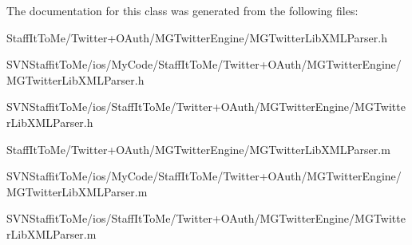 \-The documentation for this class was generated from the following files\-:\begin{DoxyCompactItemize}
\item 
\-Staff\-It\-To\-Me/\-Twitter+\-O\-Auth/\-M\-G\-Twitter\-Engine/\-M\-G\-Twitter\-Lib\-X\-M\-L\-Parser.\-h\item 
\-S\-V\-N\-Staffit\-To\-Me/ios/\-My\-Code/\-Staff\-It\-To\-Me/\-Twitter+\-O\-Auth/\-M\-G\-Twitter\-Engine/\-M\-G\-Twitter\-Lib\-X\-M\-L\-Parser.\-h\item 
\-S\-V\-N\-Staffit\-To\-Me/ios/\-Staff\-It\-To\-Me/\-Twitter+\-O\-Auth/\-M\-G\-Twitter\-Engine/\-M\-G\-Twitter\-Lib\-X\-M\-L\-Parser.\-h\item 
\-Staff\-It\-To\-Me/\-Twitter+\-O\-Auth/\-M\-G\-Twitter\-Engine/\-M\-G\-Twitter\-Lib\-X\-M\-L\-Parser.\-m\item 
\-S\-V\-N\-Staffit\-To\-Me/ios/\-My\-Code/\-Staff\-It\-To\-Me/\-Twitter+\-O\-Auth/\-M\-G\-Twitter\-Engine/\-M\-G\-Twitter\-Lib\-X\-M\-L\-Parser.\-m\item 
\-S\-V\-N\-Staffit\-To\-Me/ios/\-Staff\-It\-To\-Me/\-Twitter+\-O\-Auth/\-M\-G\-Twitter\-Engine/\-M\-G\-Twitter\-Lib\-X\-M\-L\-Parser.\-m\end{DoxyCompactItemize}
